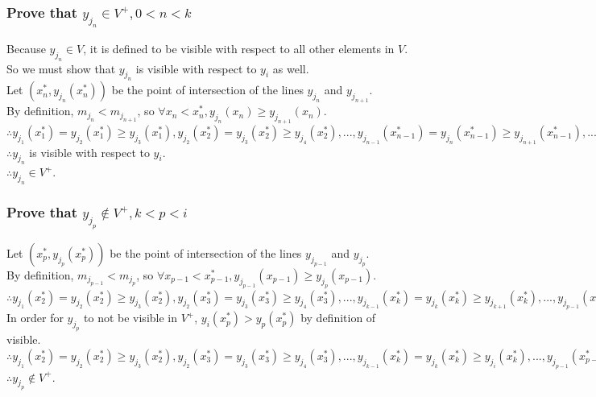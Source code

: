 \documentclass{article}
\begin{document}
\subsubsection*{Prove that $y_{j_n} \in V^+, 0 < n < k$}
Because $y_{j_n} \in V$, it is defined to be visible with respect to all other elements in $V$.\\
So we must show that $y_{j_n}$ is visible with respect to $y_i$ as well.\\
Let $(x^*_n, y_{j_n}(x^*_n))$ be the point of intersection of the lines $y_{j_n}$ and $y_{j_{n+1}}$.\\
By definition, $m_{j_n} < m_{j_{n+1}}$, so $\forall x_n < x^*_n, y_{j_n} (x_n) \geq y_{j_{n+1}} (x_n)$.\\
$\therefore y_{j_{1}}(x^*_{1}) = y_{j_{2}}(x^*_{1}) \geq y_{j_3}(x^*_{1}), y_{j_{2}}(x^*_{2}) = y_{j_{3}}(x^*_{2}) \geq y_{j_4}(x^*_{2}), ..., y_{j_{n-1}}(x^*_{n-1}) = y_{j_{n}}(x^*_{n-1}) \geq y_{j_{n+1}}(x^*_{n-1}), ..., y_{j_{k-1}}(x^*_{k-1}) = y_{j_{k}}(x^*_{k-1}) \geq y_{j_{i}}(x^*_{k-1})$\\
$\therefore y_{j_n}$ is visible with respect to $y_i$.\\
$\therefore y_{j_n} \in V^+$.

\subsubsection*{Prove that $y_{j_p} \notin V^+, k < p < i$}

Let $(x^*_p, y_{j_p}(x^*_p))$ be the point of intersection of the lines $y_{j_{p-1}}$ and $y_{j_{p}}$.\\
By definition, $m_{j_{p-1}} < m_{j_{p}}$, so $\forall x_{p-1} < x^*_{p-1}, y_{j_{p-1}} (x_{p-1}) \geq y_{j_{p}} (x_{p-1})$.\\
$\therefore y_{j_{1}}(x^*_{2}) = y_{j_{2}}(x^*_{2}) \geq y_{j_3}(x^*_{2}), y_{j_{2}}(x^*_{3}) = y_{j_{3}}(x^*_{3}) \geq y_{j_4}(x^*_{3}), ..., y_{j_{k-1}}(x^*_{k}) = y_{j_{k}}(x^*_{k}) \geq y_{j_{k+1}}(x^*_{k}), ..., y_{j_{p-1}}(x^*_{p}) = y_{j_{p}}(x^*_{p}) \geq y_{j_{p+1}}(x^*_{p}), ..., y_{j_{t-2}}(x^*_{t-1}) = y_{j_{t-1}}(x^*_{t-1}) \geq y_{j_{t}}(x^*_{t-1})$\\
In order for $y_{j_p}$ to not be visible in $V^+$, $y_i (x^*_p) > y_p (x^*_p)$ by definition of visible.\\
$\therefore y_{j_{1}}(x^*_{2}) = y_{j_{2}}(x^*_{2}) \geq y_{j_3}(x^*_{2}), y_{j_{2}}(x^*_{3}) = y_{j_{3}}(x^*_{3}) \geq y_{j_4}(x^*_{3}), ..., y_{j_{k-1}}(x^*_{k}) = y_{j_{k}}(x^*_{k}) \geq y_{j_{i}}(x^*_{k}), ..., y_{j_{p-1}}(x^*_{p-1,p}) = y_{j_{p}}(x^*_{p-1,p}) < y_{j_{i}}(x^*_{p-1,p}), ..., y_{j_{t-1}}(x^*_{t}) = y_{j_{t}}(x^*_{t}) < y_{j_{i}}(x^*_{t})$\\
$\therefore y_{j_p} \notin V^+$.
\end{document}
